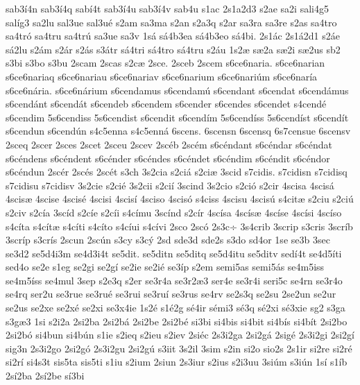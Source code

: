 {sab3^^ed4n
sab3^^ed4q
sab^^ed4t
sab3^^ed4u
sab3^^ed4v
sab4u
s1ac
2s1a2d3
s2ae
sa2i
sali4g5
sal^^edg3
sa2lu
sal3ue
sal3u^^e9
s2am
sa3ma
s2an
s2a3q
s2ar
sa3ra
sa3re
s2as
sa4tro
sa4tr^^f3
sa4tru
sa4tr^^fa
sa3ue
sa3v
1s^^e1
s^^e14b3ea
s^^e14b3eo
s^^e14bi.
2s1^^e1c
2s1^^e12d1
s2^^e1e
s^^e12lu
s2^^e1m
s2^^e1r
s2^^e1s
s3^^e1tr
s^^e14tri
s^^e14tro
s^^e14tru
s2^^e1u
1s2^^e6
s^^e62a
s^^e62i
s^^e62us
sb2
s3bi
s3bo
s3bu
2scam
2scas
s2c^^e6
2sce.
2sceb
2scem
s6ce6naria.
s6ce6narian
s6ce6nariaq
s6ce6nariau
s6ce6nariav
s6ce6narium
s6ce6nari^^fam
s6ce6nar^^eda
s6ce6n^^e1ria.
s6ce6n^^e1rium
s6cendamus
s6cendam^^fa
s6cendant
s6cendat
s6cend^^e1mus
s6cend^^e1nt
s6cend^^e1t
s6cendeb
s6cendem
s6cender
s6cendes
s6cendet
s4cend^^e9
s6cendim
5s6cendiss
5s6cendist
s6cendit
s6cend^^edm
5s6cend^^edss
5s6cend^^edst
s6cend^^edt
s6cendun
s6cend^^fan
s4c5enna
s4c5enn^^e1
6scens.
6scensn
6scensq
6s7censue
6scensv
2sceq
2scer
2sces
2scet
2sceu
2scev
2sc^^e9b
2sc^^e9m
s6c^^e9ndant
s6c^^e9ndar
s6c^^e9ndat
s6c^^e9ndens
s6c^^e9ndent
s6c^^e9nder
s6c^^e9ndes
s6c^^e9ndet
s6c^^e9ndim
s6c^^e9ndit
s6c^^e9ndor
s6c^^e9ndun
2sc^^e9r
2sc^^e9s
2sc^^e9t
s3ch
3s2cia
s2ci^^e1
s2ci^^e6
3scid
s7cidis.
s7cidisn
s7cidisq
s7cidisu
s7cidisv
3s2cie
s2ci^^e9
3s2cii
s2ci^^ed
3scind
3s2cio
s2ci^^f3
s2cir
4scisa
4scis^^e1
4scis^^e6
4scise
4scis^^e9
4scisi
4scis^^ed
4sciso
4scis^^f3
s4ciss
4scisu
4scis^^fa
s4cit^^e6
s2ciu
s2ci^^fa
s2civ
s2c^^eda
3sc^^edd
s2c^^ede
s2c^^edi
s4c^^edmu
3sc^^ednd
s2c^^edr
4sc^^edsa
4sc^^eds^^e6
4sc^^edse
4sc^^edsi
4sc^^edso
s4c^^edta
s4c^^edt^^e6
s4c^^edti
s4c^^edto
s4c^^edui
s4c^^edvi
2sco
2sc^^f3
2s3c^^f7
3s4crib
3scrip
s3cris
3scr^^edb
3scr^^edp
s3cr^^eds
2scun
2sc^^fan
s3cy
s3c^^fd
2sd
sde3d
sde2s
s3do
sd4or
1se
se3b
3sec
se3d2
se5d4i3m
se4d3i4t
se5dit.
se5ditn
se5ditq
se5d4itu
se5ditv
sed^^ed4t
se4d5^^edti
sed4o
se2e
s1eg
se2gi
se2g^^ed
se2ie
se2i^^e9
se3^^edp
s2em
semi5as
semi5^^e1s
se4m5iss
se4m5^^edss
se4mul
3sep
s2e3q
s2er
se3r4a
se3r2^^e63
ser4e
se3r4i
seri5c
se4rn
se3r4o
se4rq
ser2u
se3rue
se3ru^^e9
se3rui
se3ru^^ed
se3rus
se4rv
se2s3q
se2su
2se2un
se2ur
se2us
se2xe
se2x^^e9
se2xi
se3x4ie
1s2^^e9
s1^^e92g
s^^e94ir
s^^e9mi3
s^^e93q
s^^e92xi
s^^e93xie
sg2
s3ga
s3g^^e63
1si
s2i2a
2si2ba
2si2b^^e1
2si2be
2si2b^^e9
si3bi
si4bis
si4bit
si4b^^eds
si4b^^edt
2si2bo
2si2b^^f3
si4bun
si4b^^fan
s1ie
s2ieq
s2ieu
s2iev
2si^^e9c
2s3i2ga
2si2g^^e1
2sig^^e9
2s3i2gi
2si2g^^ed
sig3n
2s3i2go
2si2g^^f3
2s3i2gu
2si2g^^fa
s3iit
3s2il
3sim
s2in
si2o
sio2s
2s1ir
si2re
si2r^^e9
si2r^^ed
si4s3t
sis5ta
sis5ti
s1iu
s2ium
2siun
2s3iur
s2ius
s2i3uu
3si^^fam
s3i^^fan
1s^^ed
s1^^edb
2s^^ed2ba
2s^^ed2be
s^^ed3bi
}
